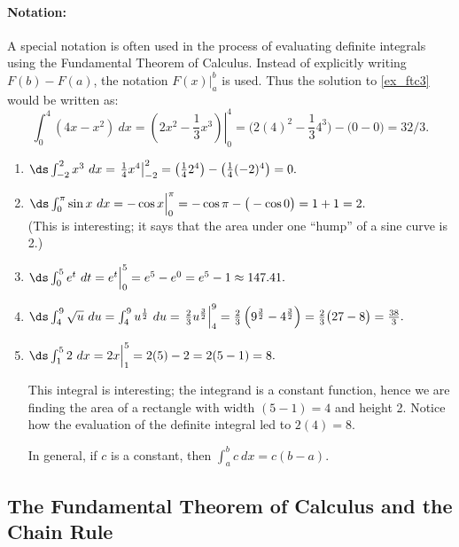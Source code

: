 \paragraph{Notation:}%
A special notation is often used in the process of evaluating definite integrals using the Fundamental Theorem of Calculus. Instead of explicitly writing $F(b)-F(a)$, the notation $F(x)\Big|_a^b$ is used. Thus the solution to \autoref{ex_ftc3} would be written as:
\[
\int_0^4(4x-x^2)\ dx = \left.\left(2x^2-\frac13x^3\right)\right|_0^4
= \big(2(4)^2-\frac134^3\big)-\big(0-0\big) =  32/3.
\]

{\begin{enumerate}
\item	$\ds \int_{-2}^2 x^3\ dx = \left.\frac14x^4\right|_{-2}^2 = \left(\frac142^4\right) - \left(\frac14(-2)^4\right) = 0.$
\item	$\ds \int_0^\pi \sin x\ dx = -\cos x\Big|_0^\pi = -\cos \pi- \big(-\cos 0\big) = 1+1=2.$ \\
(This is interesting; it says that the area under one ``hump'' of a sine curve is 2.)
\item	$\ds \int_0^5e^t\ dt = e^t\Big|_0^5 = e^5 - e^0 = e^5-1 \approx 147.41.$
\item	$\ds \int_4^9 \sqrt{u}\ du = \int_4^9 u^\frac12\ du = \left.\frac23u^\frac32\right|_4^9 = \frac23\left(9^\frac32-4^\frac32\right) = \frac23\big(27-8\big) =\frac{38}3.$
\item	$\ds \int_1^5 2\ dx = 2x\Big|_1^5 = 2(5)-2=2(5-1)=8.$ 

This integral is interesting; the integrand is a constant function, hence we are finding the area of a rectangle with width $(5-1)=4$ and height 2. Notice how the evaluation of the definite integral led to $2(4)=8$. 

In general, if $c$ is a constant, then $\int_a^b c\ dx = c(b-a)$.\eoehere
\end{enumerate}}

\subsection{The Fundamental Theorem of Calculus and the Chain Rule}

